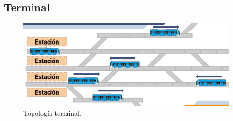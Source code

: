 \subsection{Terminal}

\lipsum[1]

    \begin{figure}[h]
        \centering
        \includegraphics[width=1\textwidth]{Figuras/terminal}
        \centering\caption{Topología terminal.}
        \label{fig:terminal_1}
    \end{figure}
    
\lipsum[1]